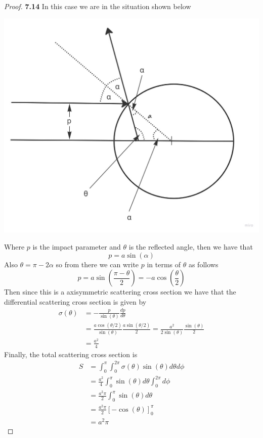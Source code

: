 \documentclass[11pt]{article}
\theoremstyle{definition}
\begin{document}
	\begin{proof}{\textbf{7.14}}
        In this case we are in the situation shown below
        \begin{center}
            \includegraphics[scale=0.2]{ch7-14.jpg}
        \end{center}
        Where $p$ is the impact parameter and $\theta$ is the reflected angle, then we
        have that
        $$p = a\sin(\alpha)$$ 
        Also $\theta = \pi - 2\alpha$ so from there we can write $p$ in terms of $\theta$
        as follows
        $$p = a\sin(\frac{\pi - \theta}{2}) = -a\cos(\frac{\theta}{2})$$
        Then since this is a axisymmetric scattering cross section we have that the
        differential scattering cross section is given by
        \begin{align*}
            \sigma(\theta) &= -\frac{p}{\sin(\theta)}\frac{dp}{d\theta}\\
                &= \frac{a\cos(\theta/2)}{\sin(\theta)}\frac{a\sin(\theta/2)}{2}
                = \frac{a^2}{2\sin(\theta)}\frac{\sin(\theta)}{2}\\
                &= \frac{a^2}{4}
        \end{align*}
        Finally, the total scattering cross section is
        \begin{align*}
            S &= \int_{0}^{\pi}\int_{0}^{2\pi}\sigma(\theta)\sin(\theta)d\theta d\phi\\
              &= \frac{a^2}{4}\int_{0}^{\pi}\sin(\theta)d\theta\int_{0}^{2\pi}d\phi\\
              &= \frac{a^2\pi}{2}\int_{0}^{\pi}\sin(\theta)d\theta\\
              &= \frac{a^2\pi}{2}\left[-\cos(\theta)\right]_{0}^{\pi}\\
              &= a^2\pi
        \end{align*}
    \end{proof}
\end{document}
